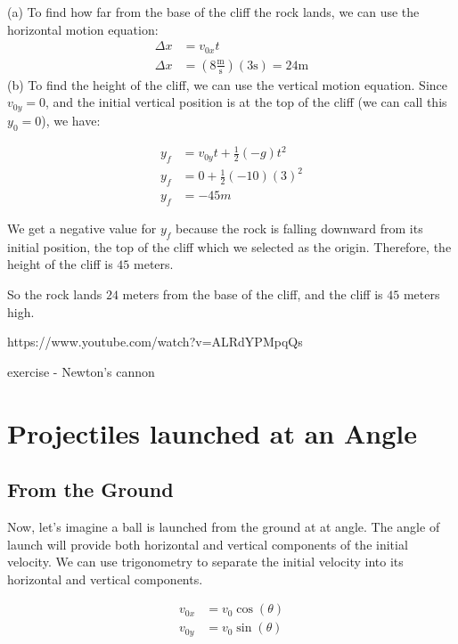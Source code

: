 \begin{Answer}[ref=projectiles_horiz1]
(a) To find how far from the base of the cliff the rock lands, we can use the horizontal motion equation:
\begin{align*}
    \Delta x &= v_{0x} t\\
    \Delta x &= (8 \tfrac{\text{m}}{\text{s}})(3 \text{s}) = 24 \text{m}
\end{align*}
(b) To find the height of the cliff, we can use the vertical motion equation. Since $v_{0y} = 0$, and the initial vertical position is at the top of the cliff (we can call this $y_0 = 0$), we have:

\begin{align*}
    y_f &= v_{0y} t + \frac{1}{2} (-g) t^2 \\
    y_f &= 0 + \frac{1}{2} (-10) (3)^{2} \\
    y_f &= -45 m
\end{align*}

We get a negative value for $y_f$ because the rock is falling downward from its initial position, the top of the cliff which we selected as the origin. Therefore, the height of the cliff is $45$ meters.

So the rock lands $24$ meters from the base of the cliff, and the cliff is $45$ meters high.

\end{Answer}



https://www.youtube.com/watch?v=ALRdYPMpqQs

exercise - Newton's cannon %

\section{Projectiles launched at an Angle}
\subsection{From the Ground}

Now, let's imagine a ball is launched from the ground at at angle. The angle of launch will provide both horizontal and vertical components of the initial velocity. We can use trigonometry to separate the initial velocity into its horizontal and vertical components.

\begin{align*}
v_{0x} &= v_0 \cos(\theta) \\
v_{0y} &= v_0 \sin(\theta)
\end{align*}

